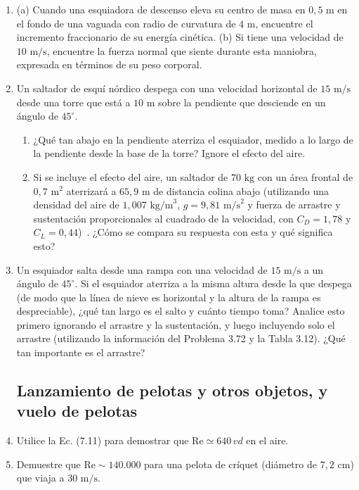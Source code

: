 \documentclass[12pt]{book}
\begin{document}
\begin{enumerate}
\item[3.71] (a) Cuando una esquiadora de descenso eleva su centro de masa en $0{,}5\text{ m}$ en el fondo de una vaguada con radio de curvatura de $4\text{ m}$, encuentre el incremento fraccionario de su energía cinética.
(b) Si tiene una velocidad de $10\text{ m/s}$, encuentre la fuerza normal que siente durante esta maniobra, expresada en términos de su peso corporal.

\item[3.72] Un saltador de esquí nórdico despega con una velocidad horizontal de $15\text{ m/s}$ desde una torre que está a $10\text{ m}$ sobre la pendiente que desciende en un ángulo de $45^\circ$.
\begin{enumerate}
\item[(a)] ¿Qué tan abajo en la pendiente aterriza el esquiador, medido a lo largo de la pendiente desde la base de la torre? Ignore el efecto del aire.
\item[(b)] Si se incluye el efecto del aire, un saltador de $70\text{ kg}$ con un área frontal de $0{,}7\text{ m}^2$ aterrizará a $65{,}9\text{ m}$ de distancia colina abajo (utilizando una densidad del aire de $1{,}007\text{ kg/m}^3$, $g = 9{,}81\text{ m/s}^2$ y fuerza de arrastre y sustentación proporcionales al cuadrado de la velocidad, con $C_D = 1{,}78$ y $C_L = 0{,}44$)~\cite{ref37}. ¿Cómo se compara su respuesta con esta y qué significa esto?
\end{enumerate}

\item[3.73] Un esquiador salta desde una rampa con una velocidad de $15\text{ m/s}$ a un ángulo de $45^\circ$. Si el esquiador aterriza a la misma altura desde la que despega (de modo que la línea de nieve es horizontal y la altura de la rampa es despreciable), ¿qué tan largo es el salto y cuánto tiempo toma? Analice esto primero ignorando el arrastre y la sustentación, y luego incluyendo solo el arrastre (utilizando la información del Problema 3.72 y la Tabla 3.12). ¿Qué tan importante es el arrastre?

\subsection*{Lanzamiento de pelotas y otros objetos, y vuelo de pelotas}

\item[3.74] Utilice la Ec. (7.11) para demostrar que $\text{Re} \simeq 640\,vd$ en el aire.

\item[3.75] Demuestre que $\text{Re} \sim 140.000$ para una pelota de críquet (diámetro de $7{,}2\text{ cm}$) que viaja a $30\text{ m/s}$.


\end{enumerate}
\end{document}
